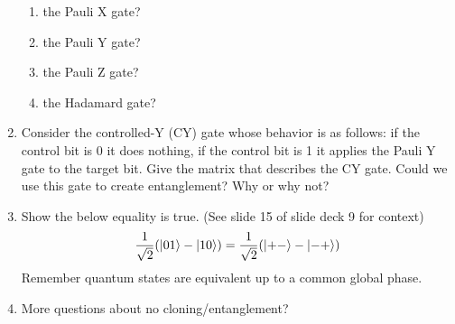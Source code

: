 \documentclass[12pt]{article}
\begin{document}
\begin{enumerate}[font=\bfseries]
\begin{enumerate}
            \item the Pauli X gate?
            \item the Pauli Y gate?
            \item the Pauli Z gate?
            \item the Hadamard gate?
        \end{enumerate}
    \item Consider the controlled-Y (CY) gate whose behavior is as follows: if the control bit is 0 it does nothing, if the control bit is 1 it applies the Pauli Y gate to the target bit. Give the matrix that describes the CY gate. Could we use this gate to create entanglement? Why or why not?
    \item Show the below equality is true. (See slide 15 of slide deck 9 for context)
    \[\frac{1}{\sqrt{2}}(\ket{01} - \ket{10}) = \frac{1}{\sqrt{2}}(\ket{+-} - \ket{-+})\]
    Remember quantum states are equivalent up to a common global phase.
    \item More questions about no cloning/entanglement?
\end{enumerate}
\end{document}
